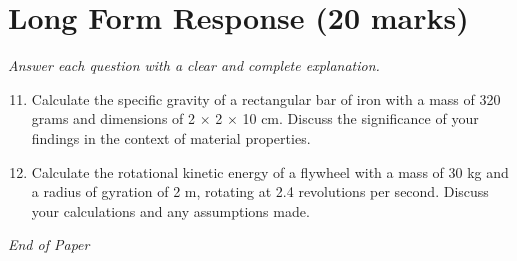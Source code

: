 \documentclass[12pt]{article}
\begin{document}
\section*{Long Form Response (20 marks)}
\textit{Answer each question with a clear and complete explanation.}
\begin{enumerate}[label=\arabic*.]
\setcounter{enumi}{10}
\item Calculate the specific gravity of a rectangular bar of iron with a mass of 320 grams and dimensions of 2 \ensuremath{\times} 2 \ensuremath{\times} 10 cm. Discuss the significance of your findings in the context of material properties.
\item Calculate the rotational kinetic energy of a flywheel with a mass of 30 kg and a radius of gyration of 2 m, rotating at 2.4 revolutions per second. Discuss your calculations and any assumptions made.
\end{enumerate}

\vfill
\noindent\textit{End of Paper}
\end{document}
